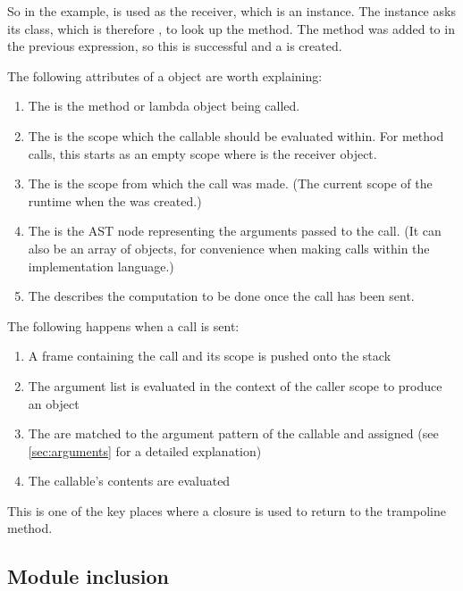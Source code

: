 So in the example,  is used as the receiver, which is an  instance. The instance asks its class, which is therefore , to look up the method. The method was added to  in the previous expression, so this is successful and a  is created.

\newpage
The following attributes of a  object are worth explaining:

\begin{enumerate}
  \item The  is the method or lambda object being called.
  \item The  is the scope which the callable should be evaluated within. For method calls, this starts as an empty scope where  is the receiver object.
  \item The  is the scope from which the call was made. (The current scope of the runtime when the  was created.)
  \item The  is the  AST node representing the arguments passed to the call. (It can also be an array of objects, for convenience when making calls within the implementation language.)
  \item The  describes the computation to be done once the call has been sent.
\end{enumerate}

The following happens when a call is sent:

\begin{enumerate}
  \item A frame containing the call and its scope is pushed onto the stack
  \item The argument list is evaluated in the context of the caller scope to produce an  object
  \item The  are matched to the argument pattern of the callable and assigned (see \autoref{sec:arguments} for a detailed explanation)
  \item The callable's contents are evaluated
\end{enumerate}

This is one of the key places where a closure is used to return to the trampoline method.

\subsection{Module inclusion}
\label{sec:module_inclusion}

